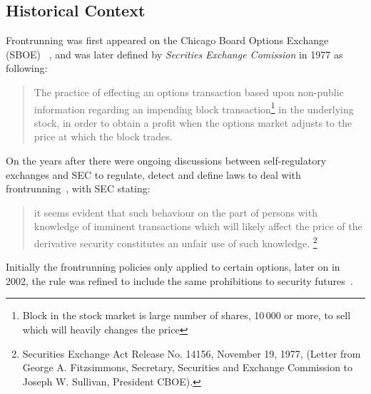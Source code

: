 

\subsection{Historical Context}
Frontrunning was first appeared on the Chicago Board Options Exchange (SBOE) ~\cite{markham1988front}, and was later defined by \textit{Secrities Exchange Comission} in 1977 as following:
\begin{quote}
The practice of effecting an options transaction based upon non-public information regarding an impending block transaction\footnote{Block in the stock market is large number of shares, 10\,000 or more, to sell which will heavily changes the price} in the underlying stock, in order to obtain a profit when the options market adjusts to the price at which the block trades. ~\cite{sec1978cboe}
\end{quote} 




On the years after there were ongoing discussions between self-regulatory exchanges and SEC to regulate, detect and define laws to deal with frontrunning~\cite{markham1988front}, with SEC stating: 
\begin{quote}
it seems evident that such behaviour on the part of persons with knowledge of imminent transactions which will likely affect the price of the derivative security constitutes an unfair use of such knowledge. \footnote{Securities Exchange Act Release No. 14156, November 19, 1977, (Letter from George A. Fitzsimmons, Secretary, Securities and Exchange Commission to Joseph W. Sullivan, President  CBOE).}
\end{quote} 
Initially the frontrunning policies only applied to certain options, later on in 2002, the rule was refined to include the same prohibitions to security futures~\cite{sec2012frontrunning}.

